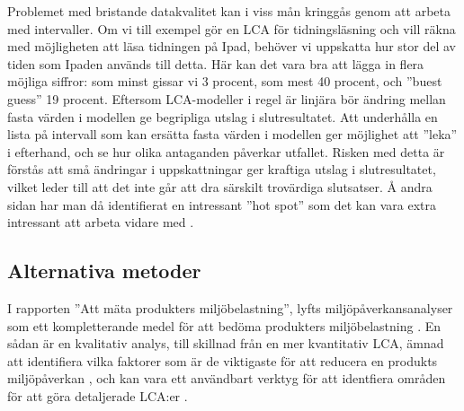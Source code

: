\documentclass{article}
\begin{document}
Problemet med bristande datakvalitet kan i viss mån kringgås genom att arbeta med intervaller. Om vi till exempel gör en LCA för tidningsläsning och vill räkna med möjligheten att läsa tidningen på Ipad, behöver vi uppskatta hur stor del av tiden som Ipaden används till detta. Här kan det vara bra att lägga in flera möjliga siffror: som minst gissar vi 3 procent, som mest 40 procent, och ''buest guess'' 19 procent. Eftersom LCA-modeller i regel är linjära bör ändring mellan fasta värden i modellen ge begripliga utslag i slutresultatet. Att underhålla en lista på intervall som kan ersätta fasta värden i modellen ger möjlighet att ''leka'' i efterhand, och se hur olika antaganden påverkar utfallet. Risken med detta är förstås att små ändringar i uppskattningar ger kraftiga utslag i slutresultatet, vilket leder till att det inte går att dra särskilt trovärdiga slutsatser. Å andra sidan har man då identifierat en intressant ''hot spot'' som det kan vara extra intressant att arbeta vidare med .

\subsection{Alternativa metoder}

I rapporten ''Att mäta produkters miljöbelastning'', lyfts miljöpåverkansanalyser som ett kompletterande medel för att bedöma produkters miljöbelastning . En sådan är en kvalitativ analys, till skillnad från en mer kvantitativ LCA, ämnad att identifiera vilka faktorer som är de viktigaste för att reducera en produkts miljöpåverkan , och kan vara ett användbart verktyg för att identfiera områden för att göra detaljerade LCA:er .


\end{document}
